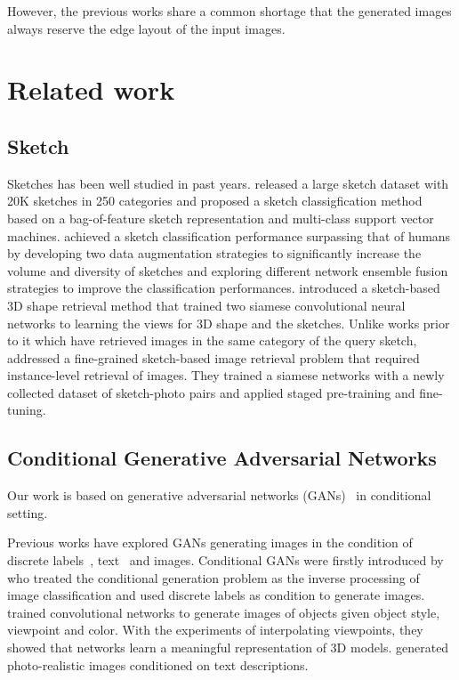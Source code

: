 However, the previous works share a common shortage that the generated images always reserve the edge layout of the input images. 




\section{Related work}
\subsection{Sketch}
Sketches has been well studied in past years. \cite{HowToSketch} released a large sketch dataset with 20K sketches in 250 categories and proposed a sketch classigfication method based on a bag-of-feature sketch representation and multi-class support vector machines. 
%
\cite{SketchANet} achieved a sketch classification performance surpassing that of humans by developing two data augmentation strategies to significantly increase the volume and diversity of sketches and exploring different network ensemble fusion strategies to improve the classification performances.
\cite{Sketch3DShape} introduced a sketch-based 3D shape retrieval method that trained two siamese convolutional neural networks to learning the views for 3D shape and the sketches.
Unlike works prior to it which have retrieved images in the same category of the query sketch, \cite{SketchMeThatShoe} addressed a fine-grained sketch-based image retrieval problem that required instance-level retrieval of images. They trained a siamese networks with a newly collected dataset of sketch-photo pairs and applied staged pre-training and fine-tuning.

\subsection{Conditional Generative Adversarial Networks}
Our work is based on generative adversarial networks (GANs)~\cite{GAN} in conditional setting. 

Previous works have explored GANs generating images in the condition of discrete labels~\cite{CGAN}, text~\cite{Reed2016} and images. 
Conditional GANs were firstly introduced by \cite{CGAN} who treated the conditional generation problem as the inverse processing of image classification and used discrete labels as condition to generate images.
%
\cite{Dosovitskiy2014} trained convolutional networks to generate images of objects given object style, viewpoint and color. With the experiments of interpolating viewpoints, they showed that networks learn a meaningful representation of 3D models. 
%
\cite{Reed2016} generated photo-realistic images conditioned on text descriptions.

